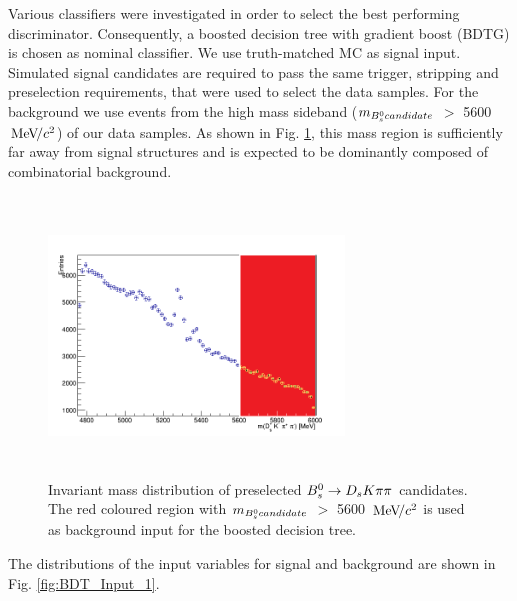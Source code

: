 Various classifiers were investigated in order to select the best performing discriminator. Consequently, a boosted decision tree with gradient boost (BDTG) is chosen as nominal classifier. 
We use truth-matched MC
as signal input. 
Simulated signal candidates are required to pass the same trigger, stripping and preselection requirements, that were used to select the data samples. 
For the background we use events from the high mass sideband ($m_{{{B}^0_{s}} candidate}$ $>$ 5600 ${\mathrm{\,Me\kern -0.1em V\!/}c^2}$) of our data samples. 
As shown in Fig. \ref{fig:massforBDT}, this mass region is sufficiently far away from signal structures and is expected to be dominantly composed of combinatorial background. \newline

\begin{figure}[h]
\includegraphics[height=7.4cm,width=0.7\textwidth]{figs/mass_Bs_forBDT_12_AnA.png}
\caption{Invariant mass distribution of preselected ${{B}^0_{s}}\rightarrow{\ensuremath{{D}_{s}}}{\ensuremath{K}}{\ensuremath{\pi}}{\ensuremath{\pi}}$ candidates. The red coloured region with $m_{{{B}^0_{s}} candidate}$ $>$ 5600 ${\mathrm{\,Me\kern -0.1em V\!/}c^2}$ is used as background input for the boosted decision tree.}
\label{fig:massforBDT}
\end{figure}

The distributions of the input variables for signal and background are shown in Fig. \ref{fig:BDT_Input_1}. 

